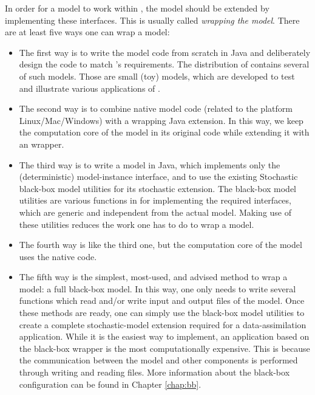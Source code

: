 In order for a model to work within \oda, the model should be extended by implementing these interfaces. This is usually called \emph{wrapping the model}. There are at least five ways one can wrap a model:
\begin{itemize}
\item The first way is to write the model code from scratch in Java and deliberately design the code to match \oda's requirements. The distribution of \oda contains several of such models. Those are small (toy) models, which are developed to test and illustrate various applications of \oda. 
\item The second way is to combine native model code (related to the platform Linux/Mac/Win\-dows) with a wrapping Java extension. In this way, we keep the computation core of the model in its original code while extending it with an \oda wrapper. 
\item The third way is to write a model in Java, which implements only the (deterministic) model-instance interface, and to use the existing Stochastic black-box model utilities for its stochastic extension. The black-box model utilities are various functions in \oda for implementing the required interfaces, which are generic and independent from the actual model. Making use of these utilities reduces the work one has to do to wrap a model. 
\item The fourth way is like the third one, but the computation core of the model uses the native code. 
\item The fifth way is the simplest, most-used, and advised method to wrap a model: a full black-box model. In this way, one only needs to write several functions which read and/or write input and output files of the model. Once these methods are ready, one can simply use the black-box model utilities to create a complete stochastic-model extension required for a data-assimilation application. While it is the easiest way to implement, an application based on the black-box wrapper is the most computationally expensive. This is because the communication between the model and other \oda components is performed through writing and reading files. More information about the black-box configuration can be found in Chapter \ref{chap:bb}.
\end{itemize}

